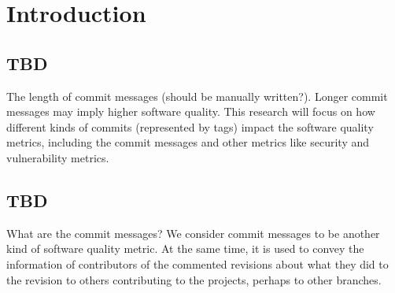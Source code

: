 \section{Introduction}

\subsection{TBD}

The length of commit messages (should be manually written?). Longer commit messages may imply higher software quality.
This research will focus on how different kinds of commits (represented by tags) impact the software quality metrics, including the commit messages and other metrics like security and vulnerability metrics.

\subsection{TBD}

What are the commit messages? We consider commit messages to be another kind of software quality metric. At the same time, it is used to convey the information of contributors of the commented revisions about what they did to the revision to others contributing to the projects, perhaps to other branches.

